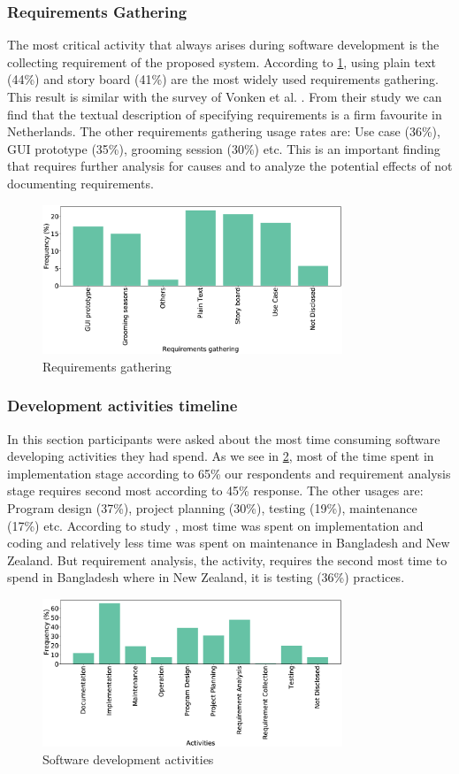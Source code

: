 \subsubsection{Requirements Gathering}
The most critical activity that always arises during software development is the collecting requirement of the proposed system. According to \cref{fig:requirements}, using plain text (44\%) and story board (41\%) are the most widely used requirements gathering. This result is similar with the survey of Vonken et al. \citep{Vonken2012}. From their study we can find that the textual description of specifying requirements is a firm favourite in Netherlands. The other requirements gathering usage rates are: Use case (36\%), GUI prototype (35\%), grooming session (30\%) etc. This is an important finding that requires further analysis for causes and to analyze the potential effects of not documenting requirements.
\begin{figure}[htbp]
\centering
  \includegraphics[width=0.8\textwidth]{Figures/Requirements_Gathering}
  \caption{Requirements gathering}
  \label{fig:requirements}
\end{figure}

\subsubsection{Development activities timeline}
In this section participants were asked about the most time consuming software developing activities they had spend. As we see in \cref{fig:activities}, most of the time spent in implementation stage according to 65\% our respondents and requirement analysis stage requires second most according to 45\% response. The other usages are: Program design (37\%), project planning (30\%), testing (19\%), maintenance (17\%) etc. According to study \citep{Wang2018}, most time was spent on implementation and coding and relatively less time was spent on maintenance in Bangladesh and New Zealand. But requirement analysis, the activity, requires the second most time to spend in Bangladesh where in New Zealand, it is testing (36\%) practices.

\begin{figure}[htbp]
\centering
  \includegraphics[width=0.8\textwidth]{Figures/Respondents_Activities}
  \caption{Software development activities}
  \label{fig:activities}
\end{figure}